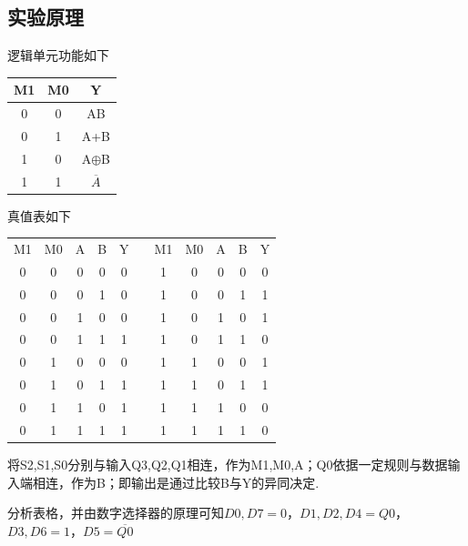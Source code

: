 \documentclass[11pt,UTF8]{ctexart}
\begin{document}
\subsection{实验原理}
逻辑单元功能如下
\begin{table}[H]
  \centering
    \begin{tabular}{|c|c|c|}
    \hline
    M1    & M0    & Y \bigstrut\\
    \hline
    0     & 0     & AB \bigstrut\\
    \hline
    0     & 1     & A+B \bigstrut\\
    \hline
    1     & 0     & A$\oplus$B \bigstrut\\
    \hline
    1     & 1     & $\overline{A}$ \bigstrut\\
    \hline
    \end{tabular}%
  \label{tab:addlabel}%
\end{table}%
\par 真值表如下
\begin{table}[H]
  \centering
    \begin{tabular}{|c|c|c|c|c|r|c|c|c|c|c|}
\cline{1-5}\cline{7-11}    M1    & M0    & A     & B     & Y     &       & M1    & M0    & A     & B     & Y \bigstrut\\
\cline{1-5}\cline{7-11}    0     & 0     & 0     & 0     & 0     &       & 1     & 0     & 0     & 0     & 0 \bigstrut\\
\cline{1-5}\cline{7-11}    0     & 0     & 0     & 1     & 0     &       & 1     & 0     & 0     & 1     & \textcolor[rgb]{ 1,  0,  0}{1} \bigstrut\\
\cline{1-5}\cline{7-11}    0     & 0     & 1     & 0     & 0     &       & 1     & 0     & 1     & 0     & \textcolor[rgb]{ 1,  0,  0}{1} \bigstrut\\
\cline{1-5}\cline{7-11}    0     & 0     & 1     & 1     & \textcolor[rgb]{ 1,  0,  0}{1} &       & 1     & 0     & 1     & 1     & 0 \bigstrut\\
\cline{1-5}\cline{7-11}    0     & 1     & 0     & 0     & 0     &       & 1     & 1     & 0     & 0     & \textcolor[rgb]{ 1,  0,  0}{1} \bigstrut\\
\cline{1-5}\cline{7-11}    0     & 1     & 0     & 1     & \textcolor[rgb]{ 1,  0,  0}{1} &       & 1     & 1     & 0     & 1     & \textcolor[rgb]{ 1,  0,  0}{1} \bigstrut\\
\cline{1-5}\cline{7-11}    0     & 1     & 1     & 0     & \textcolor[rgb]{ 1,  0,  0}{1} &       & 1     & 1     & 1     & 0     & 0 \bigstrut\\
\cline{1-5}\cline{7-11}    0     & 1     & 1     & 1     & \textcolor[rgb]{ 1,  0,  0}{1} &       & 1     & 1     & 1     & 1     & 0 \bigstrut\\
\cline{1-5}\cline{7-11}    \end{tabular}%
\end{table}%
\par 将S2,S1,S0分别与输入Q3,Q2,Q1相连，作为M1,M0,A；Q0依据一定规则与数据输入端相连，作为B；即输出是通过比较B与Y的异同决定.
\par 分析表格，并由数字选择器的原理可知$D0,D7=0$，$D1,D2,D4=Q0$，$D3,D6=1$，$D5=\overline{Q0}$
\end{document}

